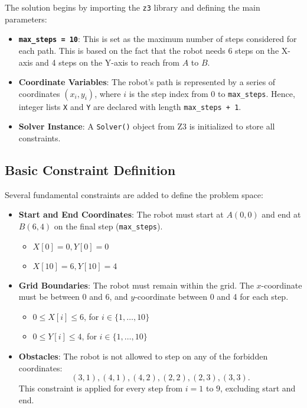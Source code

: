 \documentclass[11pt,a4paper
]{article}
\begin{document}
The solution begins by importing the \texttt{z3} library and defining the main parameters:
\begin{itemize}
  \item \textbf{\texttt{max\_steps = 10}}: This is set as the maximum number of steps considered for each path. This is based on the fact that the robot needs 6 steps on the X-axis and 4 steps on the Y-axis to reach from \( A \) to \( B \).
  \item \textbf{Coordinate Variables}: The robot's path is represented by a series of coordinates \( (x_i, y_i) \), where \( i \) is the step index from \( 0 \) to \texttt{max\_steps}. Hence, integer lists \texttt{X} and \texttt{Y} are declared with length \texttt{max\_steps + 1}.
  \item \textbf{Solver Instance}: A \texttt{Solver()} object from Z3 is initialized to store all constraints.
\end{itemize}

\subsection*{Basic Constraint Definition}

Several fundamental constraints are added to define the problem space:

\begin{itemize}
  \item \textbf{Start and End Coordinates}: The robot must start at \( A(0,0) \) and end at \( B(6,4) \) on the final step (\texttt{max\_steps}).
        \begin{itemize}
          \item \( X[0] = 0, Y[0] = 0 \)
          \item \( X[10] = 6, Y[10] = 4 \)
        \end{itemize}
  \item \textbf{Grid Boundaries}: The robot must remain within the grid. The \( x \)-coordinate must be between 0 and 6, and \( y \)-coordinate between 0 and 4 for each step.
        \begin{itemize}
          \item \( 0 \le X[i] \le 6 \), for \( i \in \{1, \ldots, 10\} \)
          \item \( 0 \le Y[i] \le 4 \), for \( i \in \{1, \ldots, 10\} \)
        \end{itemize}
  \item \textbf{Obstacles}: The robot is not allowed to step on any of the forbidden coordinates: \[(3, 1), (4, 1), (4, 2), (2,2), (2,3), (3,3).\] This constraint is applied for every step from \( i = 1 \) to \( 9 \), excluding start and end.
\end{itemize}
\end{document}
